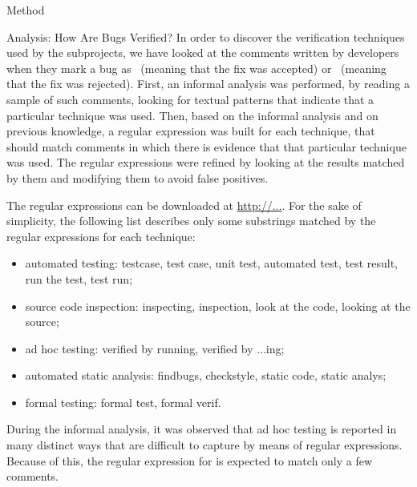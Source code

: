 \begin{section}{Method}
\begin{subsection}{Analysis: How Are Bugs Verified?}
	In order to discover the verification techniques used by the subprojects, we have looked at the comments written by developers when they mark a bug as \VERIFIED\ (meaning that the fix was accepted) or \REOPENED\ (meaning that the fix was rejected). First, an informal analysis was performed, by reading a sample of such comments, looking for textual patterns that indicate that a particular technique was used. Then, based on the informal analysis and on previous knowledge, a regular expression was built for each technique, that should match comments in which there is evidence that that particular technique was used. The regular expressions were refined by looking at the results matched by them and modifying them to avoid false positives. 
	
	The regular expressions can be downloaded at \url{http://...}. For the sake of simplicity, the following list describes only some substrings matched by the regular expressions for each technique:
		
	\begin{itemize}
		\item automated testing: testcase, test case, unit test, automated test, test result, run the test, test run;
		\item source code inspection: inspecting, inspection, look at the code, looking at the source;
		\item ad hoc testing: verified by running, verified by ...ing;
		\item automated static analysis: findbugs, checkstyle, static code, static analys;
		\item formal testing: formal test, formal verif.
	\end{itemize}
	
	
	During the informal analysis, it was observed that ad hoc testing is reported in many distinct ways that are difficult to capture by means of regular expressions. Because of this, the regular expression for is expected to match only a few comments.
	
	
\end{subsection}


\end{section}
